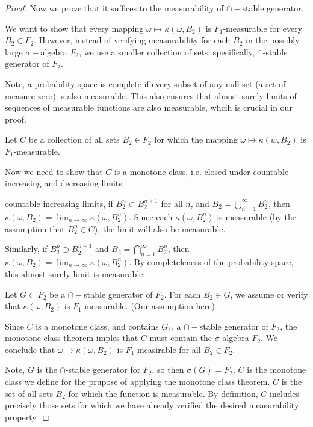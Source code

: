 \documentclass{article}
\begin{document}
\begin{proof}
    Now we prove that it suffices to the measurability of $\cap-$stable generator. 
    \par We want to show that every mapping $\omega \mapsto \kappa(\omega, B_2)$ is $F_1$-measurable for every $B_2\in F_2$. However, instead of verifying measurability for each $B_2$ in the possibly large $\sigma-$algebra $F_2$, we use a smaller collection of sets, specifically, $\cap$-stable generator of $F_2$.
    \par Note, a probability space is complete if every subset of any null set (a set of measure zero) is also measurable. This also ensures that almost surely limits of sequences of measurable functions are also measurable, whcih is crucial in our proof. 
    \par Let $C$ be a collection of all sets $B_2\in F_2$ for which the mapping $\omega \mapsto \kappa(w, B_2)$ is $F_1$-measurable. 
    \par Now we need to show that $C$ is a monotone class, i.e. closed under countable increasing and decreasing limits. 
    \par countable increasing limits, if $B_2^n \subset B_2^{n+1}$ for all $n$, and $B_2=\bigcup_{n=1}^\infty B_2^n$, then $\kappa(\omega, B_2)= \lim_{n\to \infty} \kappa(\omega, B_2^n)$. Since each $\kappa(\omega, B_2^n)$ is measurable (by the assumption that $B_2^n \in C$), the limit will also be measurable.
    \par Similarly, if $B_2^n\supset B_2^{n+1}$ and $B_2=\bigcap_{n=1}^\infty B_2^n$, then 
    $\kappa(\omega, B_2)=\lim_{n\to \infty} \kappa(\omega, B_2^n)$. By completeleness of the probability space, this almost surely limit is measurable.
    \par Let $G\subset F_2$ be a $\cap-$stable generator of $F_2$. For each $B_2\in G$, we assume or verify that $\kappa(\omega, B_2)$ is $F_1$-measurable. (Our assumption here)
    \par Since $C$ is a monotone class, and contains $G_1$, a $\cap-$stable generator of $F_2$, the monotone class theorem imples that $C$ must contain the $\sigma$-algebra $F_2$. We conclude that $\omega \mapsto \kappa(\omega, B_2)$ is $F_1$-measirable for all $B_2\in F_2$. 
    \par Note, $G$ is the $\cap$-stable generator for $F_2$, so then $\sigma(G)=F_2$. $C$ is the monotone class we define for the prupose of applying the monotone class theorem. $C$ is the set of all sets $B_2$ for which the function is measurable. By definition, $C$ includes precisely those sets for which we have already verified the desired measurability property. 

\end{proof}
\end{document}
